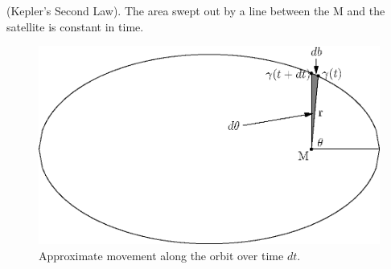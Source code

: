\documentclass[fleqn,letterpaper]{report}
\begin{document}
\begin{prop}
(Kepler's Second Law). The area swept out by a line
between the M and the satellite is constant in time.
\end{prop}

\begin{figure}[ht]
\centering
\includegraphics[width=12cm]{figure25.eps}
\caption{Approximate movement along the orbit over time
$dt$.}
\label{figure-sweeping-area}
\end{figure} 
\end{document}
